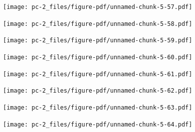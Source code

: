 \documentclass[
  letterpaper,
  DIV=11,
  numbers=noendperiod]{scrreprt}
\begin{document}
\begin{figure}[H]

{\centering \texttt{[image: pc-2\_files/figure-pdf/unnamed-chunk-5-57.pdf]}

}

\end{figure}

\begin{figure}[H]

{\centering \texttt{[image: pc-2\_files/figure-pdf/unnamed-chunk-5-58.pdf]}

}

\end{figure}

\begin{figure}[H]

{\centering \texttt{[image: pc-2\_files/figure-pdf/unnamed-chunk-5-59.pdf]}

}

\end{figure}

\begin{figure}[H]

{\centering \texttt{[image: pc-2\_files/figure-pdf/unnamed-chunk-5-60.pdf]}

}

\end{figure}

\begin{figure}[H]

{\centering \texttt{[image: pc-2\_files/figure-pdf/unnamed-chunk-5-61.pdf]}

}

\end{figure}

\begin{figure}[H]

{\centering \texttt{[image: pc-2\_files/figure-pdf/unnamed-chunk-5-62.pdf]}

}

\end{figure}

\begin{figure}[H]

{\centering \texttt{[image: pc-2\_files/figure-pdf/unnamed-chunk-5-63.pdf]}

}

\end{figure}

\begin{figure}[H]

{\centering \texttt{[image: pc-2\_files/figure-pdf/unnamed-chunk-5-64.pdf]}

}

\end{figure}
\end{document}
